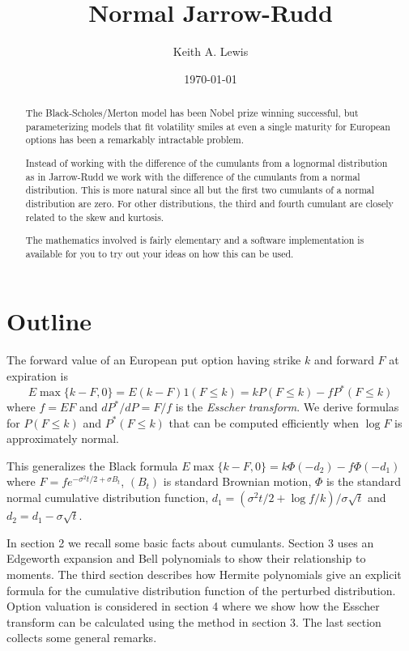 \documentclass[11pt]{article}
\title{Normal Jarrow-Rudd}
\author{Keith A. Lewis}
\date{\today}
\theoremstyle{definition}
\begin{document}
\maketitle
\begin{abstract}
The Black-Scholes/Merton model has been Nobel prize winning successful,
but parameterizing models that fit volatility smiles at even a single
maturity for European options has been a remarkably
intractable problem.

Instead of working with the difference of the cumulants from a lognormal
distribution as in Jarrow-Rudd \cite{JarRud1982} we work with the
difference of the cumulants from a normal distribution.  This is more
natural since all but the first two cumulants of a normal distribution
are zero. For other distributions, the third and fourth cumulant are closely
related to the skew and kurtosis.

The mathematics involved is fairly elementary and a software
implementation is available for you to try out your ideas
on how this can be used.
\end{abstract}

\section{Outline}
The forward value of an European put option having strike \(k\)
and forward $F$ at expiration is
\[
E\max\{k - F, 0\} = E(k - F)1(F \le k) = kP(F\le k) - fP^*(F\le k)
\]
where $f = EF$ and $dP^*/dP = F/f$
is the {\em Esscher transform}\cite{Ess1932}.
We derive formulas for
\(P(F\le k)\) and \(P^*(F\le k)\) that can be computed
efficiently when $\log F$ is approximately normal.

This generalizes the Black formula
\(E\max\{k - F,0\} = k\Phi(-d_2) - f\Phi(-d_1)\)
where \(F = fe^{-\sigma^2t/2 + \sigma B_t}\), \((B_t)\) is
standard Brownian motion, \(\Phi\) is the standard normal cumulative
distribution function, \(d_1 = (\sigma^2 t/2
+ \log f/k)/\sigma\sqrt{t}\) and \(d_2 = d_1 - \sigma\sqrt{t}\).

In section 2 we recall some basic facts about cumulants.  Section 3 uses
an Edgeworth expansion and Bell polynomials to show their relationship
to moments.
The third section describes how Hermite polynomials
give an explicit formula for the cumulative
distribution function of the perturbed distribution.  Option valuation
is considered in section 4 where we show how the Esscher transform can be
calculated using the method in section 3. The last section
collects some general remarks.
\end{document}
